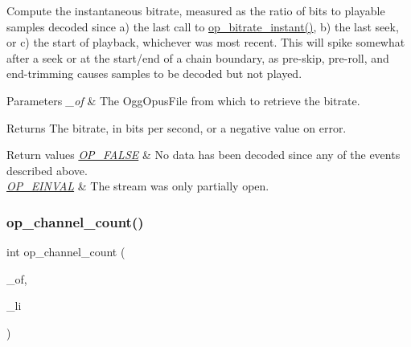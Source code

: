 Compute the instantaneous bitrate, measured as the ratio of bits to playable samples decoded since a) the last call to \mbox{\hyperlink{group__stream__info_ga7e9e871615055673d5e3c7b4c1dfce80}{op\+\_\+bitrate\+\_\+instant()}}, b) the last seek, or c) the start of playback, whichever was most recent. This will spike somewhat after a seek or at the start/end of a chain boundary, as pre-\/skip, pre-\/roll, and end-\/trimming causes samples to be decoded but not played. 
\begin{DoxyParams}{Parameters}
{\em \+\_\+of} & The {\ttfamily Ogg\+Opus\+File} from which to retrieve the bitrate. \\
\hline
\end{DoxyParams}
\begin{DoxyReturn}{Returns}
The bitrate, in bits per second, or a negative value on error. 
\end{DoxyReturn}

\begin{DoxyRetVals}{Return values}
{\em \mbox{\hyperlink{group__error__codes_ga4fd28e64a5cbe5e0ba163916199611a5}{O\+P\+\_\+\+F\+A\+L\+SE}}} & No data has been decoded since any of the events described above. \\
\hline
{\em \mbox{\hyperlink{group__error__codes_gae0879acafe9cc0ab72462d291fdb6fb6}{O\+P\+\_\+\+E\+I\+N\+V\+AL}}} & The stream was only partially open. \\
\hline
\end{DoxyRetVals}
\mbox{\label{group__stream__info_ga42c829e67c0ce8359bfbfc31a45c04f4}} 
\subsubsection{\texorpdfstring{op\_channel\_count()}{op\_channel\_count()}}
{\footnotesize\ttfamily int op\+\_\+channel\+\_\+count (\begin{DoxyParamCaption}\item[{const Ogg\+Opus\+File $\ast$}]{\+\_\+of,  }\item[{int}]{\+\_\+li }\end{DoxyParamCaption})}

